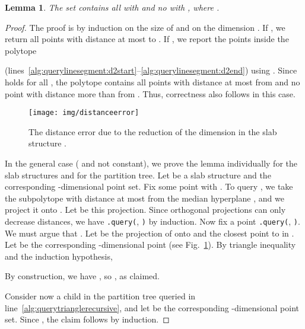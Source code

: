 \documentclass[a4paper,11pt]{paper}
\newtheorem{lemma}[theorem]{Lemma}
\begin{document}
\begin{lemma}
\label{lem:distancerror}
 The set  contains all  with   and
 no  with , where
 .
\end{lemma}
\begin{proof}
  The proof is  by induction on the size  of  and on
  the dimension .
  If , we return all points with distance at most
   to . If , we report the
  points inside the polytope
  
  (lines~\ref{alg:querylinesegment:d2start}--\ref{alg:querylinesegment:d2end})
  using .
  Since 
  holds for all , the polytope  contains
  all points with distance at most  from  and no point
  with distance more than  from . Thus,
  correctness also follows in this case.

  \begin{figure}[htbp]
    \centering
    \texttt{[image: img/distanceerror]}
    \caption{The distance error due to the reduction of the dimension
      in the slab structure .}
    \label{fig:distanceerror}
  \end{figure}

  In the general case  ( and  not constant), we prove
  the lemma individually for the slab structures and for the
  partition tree.  Let  be a slab
  structure and  the corresponding -dimensional point set.
  Fix some point  with . To
  query , we take the subpolytope 
  with distance at most  from the
  median hyperplane , and we project it onto . Let
   be this projection.
  Since
  orthogonal projections can only
  decrease distances, we have
  \texttt{.query(}, \texttt{)} by induction.
  Now fix a point \texttt{.query(}, \texttt{)}.
  We must argue that .
  Let  be the projection of  onto 
  and  the closest point to
   in .
  Let  be the corresponding -dimensional
  point (see Fig.~\ref{fig:distanceerror}).
  By triangle inequality and the induction hypothesis,
  
  By construction, we have , so
  , as claimed.

  Consider now a child in the partition tree queried in
  line~\ref{alg:querytrianglerecursive}, and let  be the
  corresponding -dimensional point set. Since
  , the claim follows by induction.
\end{proof}
\end{document}
